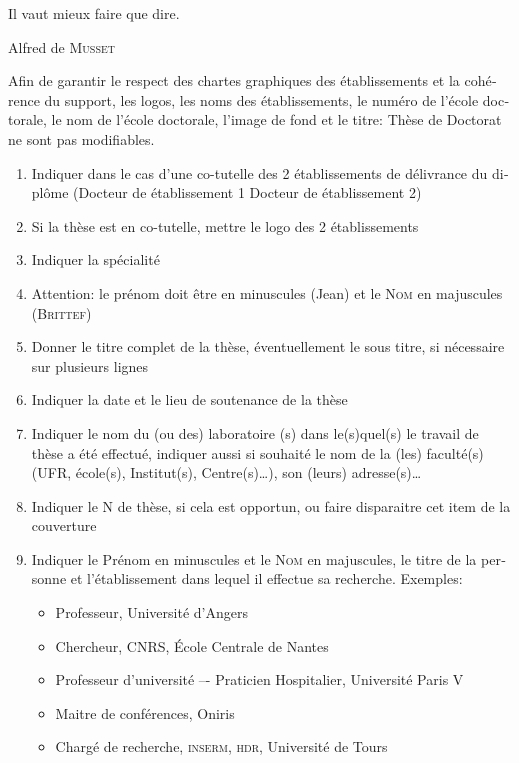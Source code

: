 \begin{otherlanguage}{french}
\epigraph{Il vaut mieux faire que dire.}{Alfred de \textsc{Musset}}
\minitoc%
Afin de garantir le respect des chartes graphiques des établissements et la cohérence du support, les  logos, les noms des établissements, le numéro de l’école doctorale, le nom de l’école doctorale, l’image de fond et le titre: Thèse de Doctorat ne sont pas modifiables.

\begin{enumerate}[label= (\arabic*)]
	\item Indiquer dans le cas d’une co-tutelle des 2 établissements de délivrance du diplôme (Docteur de établissement 1 Docteur de établissement 2)
	\item Si la thèse est en co-tutelle, mettre le logo des 2 établissements
	\item Indiquer la spécialité
	\item Attention: le prénom doit être en minuscules (Jean) et le \textsc{Nom} en majuscules (\textsc{Brittef})
	\item Donner le titre complet de la thèse, éventuellement le sous titre, si nécessaire sur plusieurs lignes
	\item Indiquer la date et le lieu de soutenance de la thèse
	\item Indiquer le nom du (ou des) laboratoire (s) dans le(s)quel(s) le travail de thèse a été effectué, indiquer aussi si souhaité le nom de la (les) faculté(s) (UFR, école(s), Institut(s), Centre(s)\ldots), son 	(leurs) adresse(s)\ldots
    \item Indiquer le N\textordmasculine{} de thèse, si cela est opportun, ou faire disparaitre cet item de la couverture
	\item Indiquer le Prénom en minuscules et le \textsc{Nom} en majuscules, le titre de la personne et
	l’établissement dans lequel il effectue sa recherche. Exemples:
	\begin{itemize}
		\item Professeur, Université d’Angers
		\item Chercheur, CNRS, École Centrale de Nantes
		\item Professeur d’université –- Praticien Hospitalier, Université Paris V
		\item Maitre de conférences, Oniris
		\item Chargé de recherche, \textsc{inserm}, \textsc{hdr}, Université de Tours
	\end{itemize}
\end{enumerate}


\end{otherlanguage}
